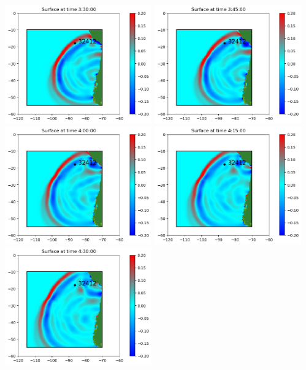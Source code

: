 \documentclass[11pt]{article}
\begin{document}
\vskip 10pt 
\includegraphics[width=0.475\textwidth]{fgout0001frame0015fig0.png}
\vskip 10pt 
\includegraphics[width=0.475\textwidth]{fgout0001frame0016fig0.png}
\vskip 10pt 
\includegraphics[width=0.475\textwidth]{fgout0001frame0017fig0.png}
\vskip 10pt 
\includegraphics[width=0.475\textwidth]{fgout0001frame0018fig0.png}
\vskip 10pt 
\includegraphics[width=0.475\textwidth]{fgout0001frame0019fig0.png}
\end{document}
